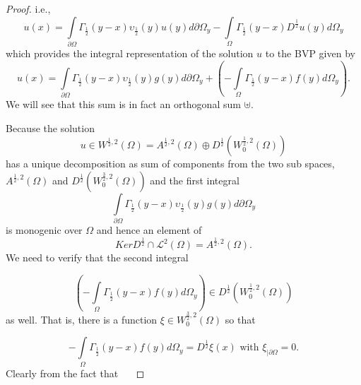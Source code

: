 \documentclass[10pt,a4paper]{amsart}
\numberwithin{equation}{section}
\begin{document}
\begin{proof}
i.e.,
\begin{equation}
u\left(  x\right)  =%
{\displaystyle\int\limits_{\partial\Omega}}
\Gamma_{\frac{1}{2}}\left(  y-x\right)  \upsilon_{\frac{1}{2}}\left(
y\right)  u\left(  y\right)  d\partial\Omega_{y}-%
{\displaystyle\int\limits_{\Omega}}
\Gamma_{\frac{1}{2}}\left(  y-x\right)  D^{\frac{1}{2}}u(y)d\Omega
_{y}\label{borel-pompeiu}%
\end{equation}
which provides the integral representation of the solution $u$ to the BVP
given by
\[
u\left(  x\right)  =%
{\displaystyle\int\limits_{\partial\Omega}}
\Gamma_{\frac{1}{2}}\left(  y-x\right)  \upsilon_{\frac{1}{2}}\left(
y\right)  g(y)d\partial\Omega_{y}+\left(  -%
{\displaystyle\int\limits_{\Omega}}
\Gamma_{\frac{1}{2}}\left(  y-x\right)  f(y)d\Omega_{y}\right)  .
\]
We will see that this sum is in fact an orthogonal sum $\uplus$. \ 

Because the solution
\[
u\in W^{\frac{1}{2},2}\left(  \Omega\right)  =A^{\frac{1}{2},2}\left(
\Omega\right)  \oplus D^{\frac{1}{2}}\left(  W_{0}^{\frac{1}{2},2}\left(
\Omega\right)  \right)
\]
has a unique decomposition as sum of components from the two sub spaces,
$A^{\frac{1}{2},2}\left(  \Omega\right)  $ and $D^{\frac{1}{2}}\left(
W_{0}^{\frac{3}{2},2}\left(  \Omega\right)  \right)  $ and the first integral
\[%
{\displaystyle\int\limits_{\partial\Omega}}
\Gamma_{\frac{1}{2}}\left(  y-x\right)  \upsilon_{\frac{1}{2}}\left(
y\right)  g(y)d\partial\Omega_{y}%
\]
is monogenic over $\Omega$ and hence an element of
\[
KerD^{\frac{1}{2}}\cap%
\mathcal{L}%
^{2}\left(  \Omega\right)  =A^{\frac{1}{2},2}\left(  \Omega\right)  .
\]
We need to verify that the second integral%

\[
\left(  -%
{\displaystyle\int\limits_{\Omega}}
\Gamma_{\frac{1}{2}}\left(  y-x\right)  f(y)d\Omega_{y}\right)  \in
D^{\frac{1}{2}}\left(  W_{0}^{\frac{1}{2},2}\left(  \Omega\right)  \right)
\]
as well. That is, there is a function $\xi\in W_{0}^{\frac{3}{2},2}\left(
\Omega\right)  $ so that%

\[
-%
{\displaystyle\int\limits_{\Omega}}
\Gamma_{\frac{1}{2}}\left(  y-x\right)  f(y)d\Omega_{y}=D^{\frac{1}{2}}%
\xi\left(  x\right)  \text{ \ \ with \ \ }\xi_{\mid\partial\Omega}=0.
\]
Clearly from the fact that \ \ %


\end{proof}
\end{document}
